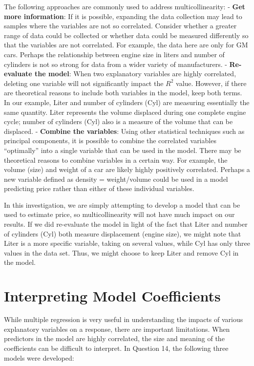 \documentclass[
]{report}
\begin{document}
The following approaches are commonly used to address multicollinearity:
- \textbf{Get more information}: If it is possible, expanding the data collection may lead to samples where the variables are not so correlated. Consider whether a greater range of data could be collected or whether data could be measured differently so that the variables are not correlated. For example, the data here are only for GM cars. Perhaps the relationship between engine size in liters and number of cylinders is not so strong for data from a wider variety of manufacturers.
- \textbf{Re-evaluate the model}: When two explanatory variables are highly correlated, deleting one variable will not significantly impact the \(R^2\) value. However, if there are theoretical reasons to include both variables in the model, keep both terms. In our example, Liter and number of cylinders (Cyl) are measuring essentially the same quantity. Liter represents the volume displaced during one complete engine cycle; number of cylinders (Cyl) also is a measure of the volume that can be displaced.
- \textbf{Combine the variables}: Using other statistical techniques such as principal components, it is possible to combine the correlated variables ``optimally'' into a single variable that can be used in the model. There may be theoretical reasons to combine variables in a certain way. For example, the volume (size) and weight of a car are likely highly positively correlated. Perhaps a new variable defined as density = weight/volume could be used in a model predicting price rather than either of these individual variables.

In this investigation, we are simply attempting to develop a model that can be used to estimate price, so multicollinearity will not have much impact on our results. If we did re-evaluate the model in light of the fact that Liter and number of cylinders (Cyl) both measure displacement (engine size), we might note that Liter is a more specific variable, taking on several values, while Cyl has only three values in the data set. Thus, we might choose to keep Liter and remove Cyl in the model.

\section{\texorpdfstring{\textbf{Interpreting Model Coefficients}}{Interpreting Model Coefficients}}\label{interpreting-model-coefficients}

While multiple regression is very useful in understanding the impacts of various explanatory variables on a response, there are important limitations. When predictors in the model are highly correlated, the size and meaning of the coefficients can be difficult to interpret. In Question 14, the following three models were developed:
\end{document}
